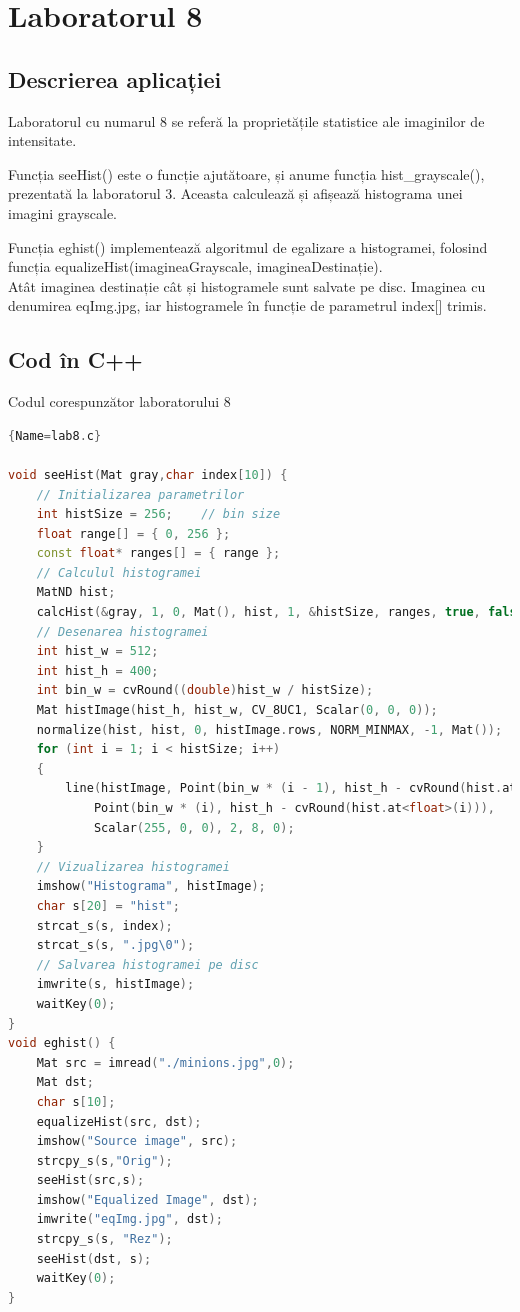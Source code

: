 \documentclass{amsart}
\begin{document}
\newpage

\section{Laboratorul 8}

\subsection{Descrierea aplicației}
\par
Laboratorul cu numarul 8 se referă la proprietățile statistice ale imaginilor de intensitate.
\\ \par
Funcția seeHist() este o funcție ajutătoare, și anume funcția hist\_grayscale(), prezentată la laboratorul 3. Aceasta calculează și afișează histograma unei imagini grayscale.
\\ \par
Funcția eghist() implementează algoritmul de egalizare a histogramei, folosind funcția equalizeHist(imagineaGrayscale, imagineaDestinație). \\Atât imaginea destinație cât și histogramele sunt salvate pe disc. Imaginea cu denumirea eqImg.jpg, iar histogramele în funcție de parametrul index[] trimis.

\subsection{Cod \^{i}n C++}

Codul corespunzător laboratorului 8

\begin{lstlisting}[language=C++]{Name=lab8.c}

void seeHist(Mat gray,char index[10]) {
	// Initializarea parametrilor
	int histSize = 256;    // bin size
	float range[] = { 0, 256 };
	const float* ranges[] = { range };
	// Calculul histogramei
	MatND hist;
	calcHist(&gray, 1, 0, Mat(), hist, 1, &histSize, ranges, true, false);
	// Desenarea histogramei
	int hist_w = 512;
	int hist_h = 400;
	int bin_w = cvRound((double)hist_w / histSize);
	Mat histImage(hist_h, hist_w, CV_8UC1, Scalar(0, 0, 0));
	normalize(hist, hist, 0, histImage.rows, NORM_MINMAX, -1, Mat());
	for (int i = 1; i < histSize; i++)
	{
		line(histImage, Point(bin_w * (i - 1), hist_h - cvRound(hist.at<float>(i - 1))),
			Point(bin_w * (i), hist_h - cvRound(hist.at<float>(i))),
			Scalar(255, 0, 0), 2, 8, 0);
	}
	// Vizualizarea histogramei
	imshow("Histograma", histImage);
	char s[20] = "hist";
	strcat_s(s, index);
	strcat_s(s, ".jpg\0");
	// Salvarea histogramei pe disc 
	imwrite(s, histImage);
	waitKey(0);
}
void eghist() {
	Mat src = imread("./minions.jpg",0);
	Mat dst;
	char s[10];
	equalizeHist(src, dst);
	imshow("Source image", src);
	strcpy_s(s,"Orig");
	seeHist(src,s);
	imshow("Equalized Image", dst);
	imwrite("eqImg.jpg", dst);
	strcpy_s(s, "Rez");
	seeHist(dst, s);
	waitKey(0);
}
 \end{lstlisting}
\end{document}
